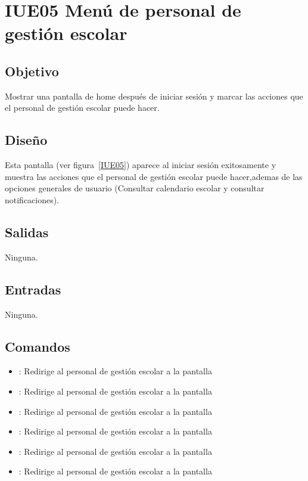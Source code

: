 \section{IUE05 Menú de personal de gestión escolar}

\subsection{Objetivo}
Mostrar una pantalla de home después de iniciar sesión y marcar las acciones que el personal de gestión escolar puede hacer.

\subsection{Diseño}
Esta pantalla  (ver figura~\ref{IUE05}) aparece al iniciar sesión exitosamente y muestra las acciones que el personal de gestión escolar puede hacer,ademas de las opciones generales de usuario (Consultar calendario escolar y consultar notificaciones). 


\subsection{Salidas}

Ninguna.

\subsection{Entradas}
Ninguna.

\subsection{Comandos}
\begin{itemize}
	\item {}: Redirige al personal de gestión escolar a la pantalla 
	\item {}: Redirige al personal de gestión escolar a la pantalla 
	\item {}: Redirige al personal de gestión escolar a la pantalla 
	\item {}: Redirige al personal de gestión escolar a la pantalla 
	\item {}: Redirige al personal de gestión escolar a la pantalla 
	\item {}: Redirige al personal de gestión escolar a la pantalla 
	
\end{itemize}

